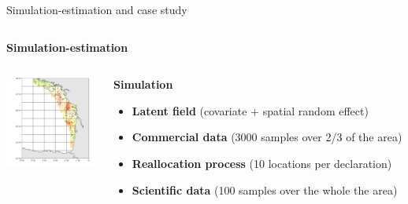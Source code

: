 \documentclass[
  10pt,
  ignorenonframetext,
]{beamer}
\begin{document}
\begin{frame}{Simulation-estimation and case study}
\protect\hypertarget{simulation-estimation-and-case-study}{}

\begin{columns}
\begin{column}{0.5\textwidth}

\center
\textbf{Simulation-estimation}

\end{column}
\begin{column}{0.5\textwidth}

\end{column}
\end{columns}

\tiny \vspace{\baselineskip}

\begin{columns}
\begin{column}{0.5\textwidth}


\begin{columns}
\begin{column}{0.45\textwidth}

\includegraphics[width=3cm]{images/data_plot.png}

\end{column}
\begin{column}{0.55\textwidth}
\footnotesize
\textbf{Simulation}
\tiny
\begin{itemize}
\item \scriptsize \textcolor{BaptisteBlue}{\textbf{Latent field}} \tiny (\textcolor{BaptisteOrange}{covariate} + \textcolor{BaptisteBrown}{spatial random effect})
\item \scriptsize \textbf{Commercial data} \tiny (3000 samples over 2/3 of the area)
\item \scriptsize \textcolor{BaptisteLightGreen}{\textbf{Reallocation process}} \tiny (10 locations per declaration)
\item \scriptsize \textcolor{SurveyBlue}{\textbf{Scientific data}} \tiny (100 samples over the whole the area)
\end{itemize}

\end{column}
\end{columns}


\end{column}
\end{columns}
\end{frame}
\end{document}
